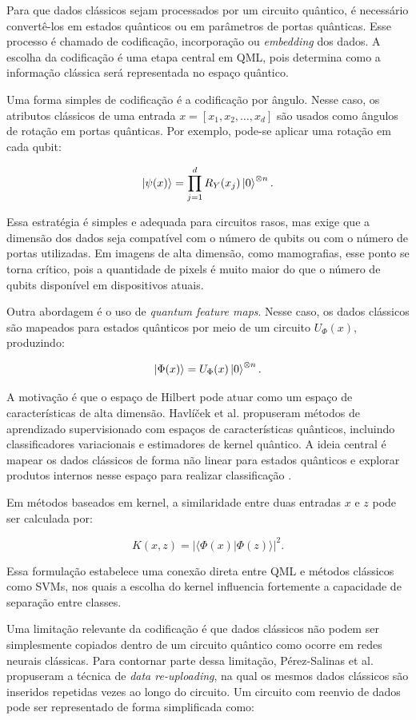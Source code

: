 \documentclass[
    12pt,
    openright,
    oneside,
    a4paper,
    english,
    brazil
]{abntex2}
\begin{document}
Para que dados clássicos sejam processados por um circuito quântico, é necessário convertê-los em estados quânticos ou em parâmetros de portas quânticas. Esse processo é chamado de codificação, incorporação ou \textit{embedding} dos dados. A escolha da codificação é uma etapa central em QML, pois determina como a informação clássica será representada no espaço quântico.

Uma forma simples de codificação é a codificação por ângulo. Nesse caso, os atributos clássicos de uma entrada \(x = [x_1, x_2, \ldots, x_d]\) são usados como ângulos de rotação em portas quânticas. Por exemplo, pode-se aplicar uma rotação em cada qubit:

\[
\ket{\psi(x)}
=
\prod_{j=1}^{d}
R_Y(x_j)
\ket{0}^{\otimes n}.
\]

Essa estratégia é simples e adequada para circuitos rasos, mas exige que a dimensão dos dados seja compatível com o número de qubits ou com o número de portas utilizadas. Em imagens de alta dimensão, como mamografias, esse ponto se torna crítico, pois a quantidade de pixels é muito maior do que o número de qubits disponível em dispositivos atuais.

Outra abordagem é o uso de \textit{quantum feature maps}. Nesse caso, os dados clássicos são mapeados para estados quânticos por meio de um circuito \(U_{\Phi}(x)\), produzindo:

\[
\ket{\Phi(x)} =
U_{\Phi}(x)\ket{0}^{\otimes n}.
\]

A motivação é que o espaço de Hilbert pode atuar como um espaço de características de alta dimensão. Havlíček et al. propuseram métodos de aprendizado supervisionado com espaços de características quânticos, incluindo classificadores variacionais e estimadores de kernel quântico. A ideia central é mapear os dados clássicos de forma não linear para estados quânticos e explorar produtos internos nesse espaço para realizar classificação \cite{havlicek2019supervised}.

Em métodos baseados em kernel, a similaridade entre duas entradas \(x\) e \(z\) pode ser calculada por:

\[
K(x,z) =
|\langle \Phi(x) | \Phi(z) \rangle|^2.
\]

Essa formulação estabelece uma conexão direta entre QML e métodos clássicos como SVMs, nos quais a escolha do kernel influencia fortemente a capacidade de separação entre classes.

Uma limitação relevante da codificação é que dados clássicos não podem ser simplesmente copiados dentro de um circuito quântico como ocorre em redes neurais clássicas. Para contornar parte dessa limitação, Pérez-Salinas et al. propuseram a técnica de \textit{data re-uploading}, na qual os mesmos dados clássicos são inseridos repetidas vezes ao longo do circuito. Um circuito com reenvio de dados pode ser representado de forma simplificada como:
\end{document}
